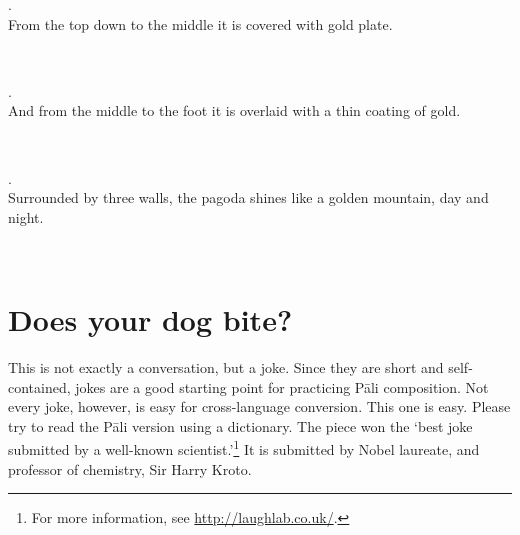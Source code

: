 \medskip
\parbox[lt]{0.93\linewidth}{\raggedright{}. \\
\hspace*{6mm}From the top down to the middle it is covered with gold plate.}\\[1mm]

\medskip
\parbox[lt]{0.93\linewidth}{\raggedright{}. \\
\hspace*{6mm}And from the middle to the foot it is overlaid with a thin coating of gold.}\\[1mm]

\medskip
\parbox[lt]{0.93\linewidth}{\raggedright{}. \\
\hspace*{6mm}Surrounded by three walls, the pagoda shines like a golden mountain, day and night.}\\[1mm]

{}
\section*{Does your dog bite?}

This is not exactly a conversation, but a joke. Since they are short and self-contained, jokes are a good starting point for practicing P\=ali composition. Not every joke, however, is easy for cross-language conversion. This one is easy. Please try to read the P\=ali version using a dictionary. The piece won the `best joke submitted by a well-known scientist.'\footnote{For more information, see \url{http://laughlab.co.uk/}.} It is submitted by Nobel laureate, and professor of chemistry, Sir Harry Kroto.

\begin{quote}
\end{quote}

